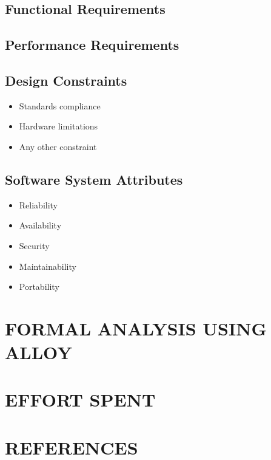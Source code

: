 \documentclass{article}
\begin{document}
\subsection{Functional Requirements}	

\subsection{Performance Requirements}
\subsection{Design Constraints}
		\begin{itemize}
			\item Standards compliance
			\item Hardware limitations
			\item Any other constraint
		\end{itemize}
\subsection{Software System Attributes}	
		\begin{itemize}
			\item Reliability
			\item Availability
			\item Security
			\item Maintainability
			\item Portability
		\end{itemize}

\section{FORMAL ANALYSIS USING ALLOY}

\section{EFFORT SPENT}

\section{REFERENCES}
\end{document}
